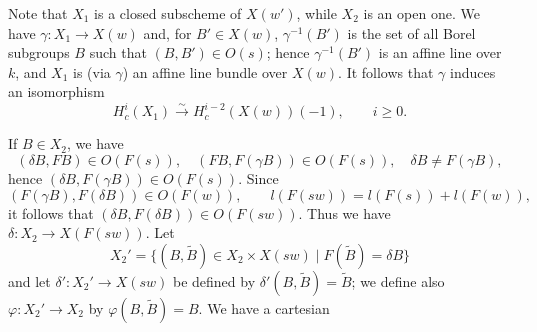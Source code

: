 \documentclass[9pt,twoside]{extarticle}
\begin{document}
{Note that \(X_1\) is a closed subscheme of \(X(w')\), while \(X_2\) is an open one. We have \(\gamma:X_1\to X(w)\) and, for \(B'\in X(w)\), \(\gamma^{-1}(B')\) is the set of all Borel subgroups \(B\) such that \((B,B')\in O(s)\); hence \(\gamma^{-1}(B')\) is an affine line over \(k\), and \(X_1\) is (via \(\gamma\)) an affine line bundle over \(X(w)\). It follows that \(\gamma\) induces an isomorphism \[
\tag{1.6.1}
H_c^i(X_1)\xrightarrow{\sim}H_c^{i-2}(X(w))(-1),\qquad i\ge 0.
\]\par

If \(B\in X_2\), we have \[
(\delta B,FB)\in O(F(s)),\quad (FB,F(\gamma B))\in O(F(s)),\quad \delta B\ne F(\gamma B),
\] hence \((\delta B,F(\gamma B))\in O(F(s))\). Since \[
(F(\gamma B),F(\delta B))\in O(F(w)),\qquad l(F(sw))=l(F(s))+l(F(w)),
\] it follows that \((\delta B,F(\delta B))\in O(F(sw))\). Thus we have \(\delta:X_2\to X(F(sw))\). Let \[
X_2'=\{(B,\widetilde B)\in X_2\times X(sw)\mid F(\widetilde B)=\delta B\}
\] and let \(\delta':X_2'\to X(sw)\) be defined by \(\delta'(B,\widetilde B)=\widetilde B\); we define also \(\varphi:X_2'\to X_2\) by \(\varphi(B,\widetilde B)=B\). We have a cartesian\par
}
\end{document}
